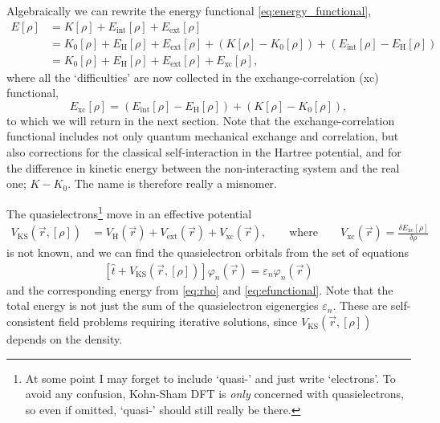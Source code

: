 \documentclass[11pt,bibliography=totoc,index=totoc]{scrbook}   %
\begin{document}
Algebraically we can rewrite the energy functional \eqref{eq:energy_functional},
\begin{align}
    E[\rho] &= K[\rho] + E_{\text{int}}[\rho] + E_{\text{ext}}[\rho] \\
    &= K_0[\rho] + E_{\text{H}}[\rho] + E_{\text{ext}}[\rho] + (K[\rho] - K_0[\rho]) + (E_{\text{int}}[\rho]-E_{\text{H}}[\rho])  \\
    &= K_0[\rho] + E_{\text{H}}[\rho] + E_{\text{ext}}[\rho] + E_{\text{xc}}[\rho],\label{eq:efunctional}
\end{align}
where all the `difficulties' are now collected in the exchange-correlation (xc) functional,
\begin{equation}
    E_{\text{xc}}[\rho] = (E_{\text{int}}[\rho] - E_{\text{H}}[\rho]) + (K[\rho]-K_0[\rho]),
  \label{eq:E_eeKS}
\end{equation}
to which we will return in the next section. 
Note that the exchange-correlation functional includes not only quantum mechanical exchange and correlation, 
but also corrections for the classical self-interaction in the Hartree potential,
and for the difference in kinetic energy between the non-interacting system and the real one; $K-K_0$.
The name is therefore really a misnomer.\cite[256]{Cramer:2004}

The quasielectrons\footnote{At some point I may forget to include `quasi-' and just write `electrons'.
    To avoid any confusion, Kohn-Sham DFT is \emph{only} concerned with quasielectrons, so even if omitted, `quasi-' should still really be there.}
    move in an effective potential
\begin{align}
    V_{\text{KS}}(\vec{r},[\rho]) &= V_{\text{H}}(\vec{r}) + V_{\text{ext}}(\vec{r}) + V_{\text{xc}}(\vec{r}),\qquad\text{where}\qquad
    V_{\text{xc}}(\vec{r}) = \frac{\delta E_{\text{xc}}[\rho]}{\delta \rho}
  \label{eq:v_eff}
\end{align}
is not known, and we can find the quasielectron orbitals from the set of equations
\begin{align}
    \left[\hat{t} + V_{\text{KS}}(\vec{r},[\rho])\right] \varphi_n(\vec{r}) = \varepsilon_n \varphi_n(\vec{r})
    \label{eq:KS}
\end{align}
and the corresponding energy from \eqref{eq:rho} and \eqref{eq:efunctional}.
Note that the total energy is not just the sum of the quasielectron eigenergies $\varepsilon_n$.
These are self-consistent field problems requiring iterative solutions, since $V_{\text{KS}}(\vec{r},[\rho])$ depends on the density.
\end{document}
